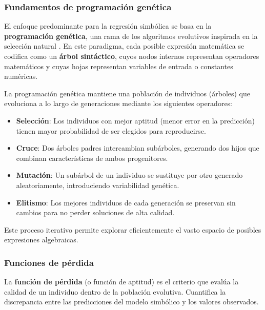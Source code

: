 \documentclass[12pt,a4paper]{article}
\begin{document}
\subsubsection*{Fundamentos de programación genética}

El enfoque predominante para la regresión simbólica se basa en la \textbf{programación genética}, una rama de los algoritmos evolutivos inspirada en la selección natural \cite{koza1992genetic}. En este paradigma, cada posible expresión matemática se codifica como un \textbf{árbol sintáctico}, cuyos nodos internos representan operadores matemáticos y cuyas hojas representan variables de entrada o constantes numéricas.

La programación genética mantiene una población de individuos (árboles) que evoluciona a lo largo de generaciones mediante los siguientes operadores:

\begin{itemize}
    \item \textbf{Selección}: Los individuos con mejor aptitud (menor error en la predicción) tienen mayor probabilidad de ser elegidos para reproducirse.
    \item \textbf{Cruce}: Dos árboles padres intercambian subárboles, generando dos hijos que combinan características de ambos progenitores.
    \item \textbf{Mutación}: Un subárbol de un individuo se sustituye por otro generado aleatoriamente, introduciendo variabilidad genética.
    \item \textbf{Elitismo}: Los mejores individuos de cada generación se preservan sin cambios para no perder soluciones de alta calidad.
\end{itemize}

Este proceso iterativo permite explorar eficientemente el vasto espacio de posibles expresiones algebraicas.

\subsubsection*{Funciones de pérdida}

La \textbf{función de pérdida} (o función de aptitud) es el criterio que evalúa la calidad de un individuo dentro de la población evolutiva. Cuantifica la discrepancia entre las predicciones del modelo simbólico y los valores observados.
\end{document}
